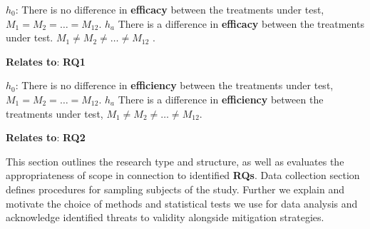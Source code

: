 \documentclass[conference]{IEEEtran}
\begin{document}
\begin{RQBox}
    $h_{0}$: There is no difference in \textbf{efficacy} between the treatments under
    test, $M_{1} = M_{2} = \dots = M_{12}$.
    $h_{a}$ There is a difference in \textbf{efficacy} between the treatments under test.
    $M_{1} \neq M_{2} \neq \dots \neq M_{12}$ .
    
    \vspace{0.3em}
    \textbf{Relates to}: \textbf{RQ1}
\end{RQBox}

\begin{RQBox}
    $h_{0}$: There is no difference in \textbf{efficiency} between the treatments under
    test, $M_{1} = M_{2} = \dots = M_{12}$.
    $h_{a}$ There is a difference in \textbf{efficiency} between the treatments
    under test, $M_{1} \neq M_{2} \neq \dots \neq M_{12}$.

    \vspace{0.3em}
    \textbf{Relates to}: \textbf{RQ2}
\end{RQBox}

This section outlines the research type and structure, as well as evaluates the
appropriateness of scope in connection to identified \textbf{RQs}. Data
collection section defines procedures for sampling subjects of the study.
Further we explain and motivate the choice of methods and statistical tests we
use for data analysis and acknowledge identified threats to validity alongside
mitigation strategies.
\end{document}

